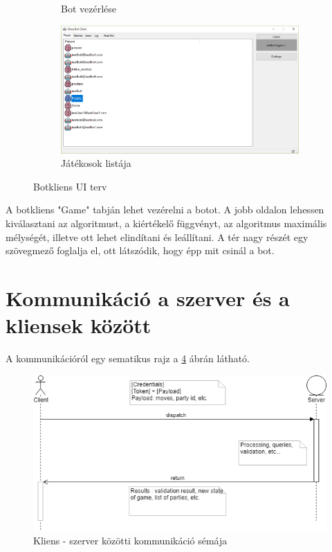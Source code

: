 \documentclass[twoside, a4paper, 12pt]{book}
\begin{document}
\begin{figure}
\begin{subfigure}[b]{0.475\textwidth}
		\caption{Bot vezérlése}
		\label{fig:botClientGame}
	\end{subfigure}
	\quad
	\begin{subfigure}[b]{0.475\textwidth}   
		\centering 
		\includegraphics[width=\textwidth]{img/botClientPlayers.png}
		\caption{Játékosok listája}
		\label{fig:botClientPlayers}
	\end{subfigure}
	\caption[ Botkliens UI terv ]
	{\small Botkliens UI terv}
	\label{fig:botClient}
\end{figure}

A botkliens "Game" tabján lehet vezérelni a botot. A jobb oldalon lehessen kiválasztani az algoritmust, a kiértékelő függvényt, az algoritmus maximális mélységét, illetve ott lehet elindítani és leállítani. A tér nagy részét egy szövegmező foglalja el, ott látszódik, hogy épp mit csinál a bot.

\section{Kommunikáció a szerver és a kliensek között}
A kommunikációról egy sematikus rajz a \ref{fig:clientServerCommunication} ábrán látható.

\begin{figure}[htbp]
	\centering
	\includegraphics[width=1.0\textwidth]{img/clientServerCommunication.png}
	\caption{Kliens - szerver közötti kommunikáció sémája}
	\label{fig:clientServerCommunication}
\end{figure}
\end{document}

